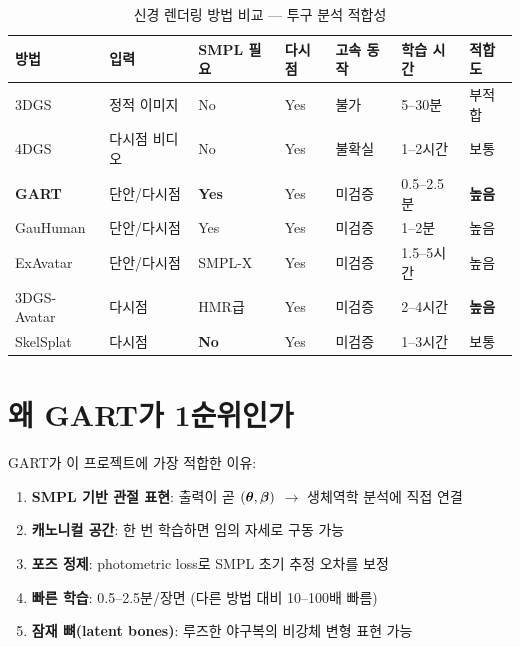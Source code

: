 \documentclass[11pt, a4paper]{report}
\begin{document}
\begin{table}[H]
\centering
\caption{신경 렌더링 방법 비교 --- 투구 분석 적합성}
\renewcommand{\arraystretch}{1.4}
\small
\begin{tabular}{p{2.3cm} p{1.8cm} p{1.5cm} p{1.5cm} p{1.5cm} p{1.8cm} p{2cm}}
\toprule
\textbf{방법} & \textbf{입력} & \textbf{SMPL 필요} & \textbf{다시점} & \textbf{고속 동작} & \textbf{학습 시간} & \textbf{적합도} \\
\midrule
3DGS & 정적 이미지 & No & Yes & \textcolor{hard}{불가} & 5--30분 & \textcolor{hard}{부적합} \\
4DGS & 다시점 비디오 & No & Yes & \textcolor{partial}{불확실} & 1--2시간 & \textcolor{partial}{보통} \\
\textbf{GART} & 단안/다시점 & \textbf{Yes} & Yes & \textcolor{partial}{미검증} & 0.5--2.5분 & \textcolor{solvable}{\textbf{높음}} \\
GauHuman & 단안/다시점 & Yes & Yes & \textcolor{partial}{미검증} & 1--2분 & \textcolor{solvable}{높음} \\
ExAvatar & 단안/다시점 & SMPL-X & Yes & \textcolor{partial}{미검증} & 1.5--5시간 & \textcolor{solvable}{높음} \\
3DGS-Avatar & 다시점 & HMR급 & Yes & \textcolor{partial}{미검증} & 2--4시간 & \textcolor{solvable}{\textbf{높음}} \\
SkelSplat & 다시점 & \textbf{No} & Yes & \textcolor{partial}{미검증} & 1--3시간 & \textcolor{partial}{보통} \\
\bottomrule
\end{tabular}
\end{table}


\section{왜 GART가 1순위인가}

\begin{keyidea}
GART가 이 프로젝트에 가장 적합한 이유:
\begin{enumerate}[leftmargin=*]
  \item \textbf{SMPL 기반 관절 표현}: 출력이 곧 $(\bm{\theta}, \bm{\beta})$ $\rightarrow$ 생체역학 분석에 직접 연결
  \item \textbf{캐노니컬 공간}: 한 번 학습하면 임의 자세로 구동 가능
  \item \textbf{포즈 정제}: photometric loss로 SMPL 초기 추정 오차를 보정
  \item \textbf{빠른 학습}: 0.5--2.5분/장면 (다른 방법 대비 10--100배 빠름)
  \item \textbf{잠재 뼈(latent bones)}: 루즈한 야구복의 비강체 변형 표현 가능
\end{enumerate}
\end{keyidea}
\end{document}
